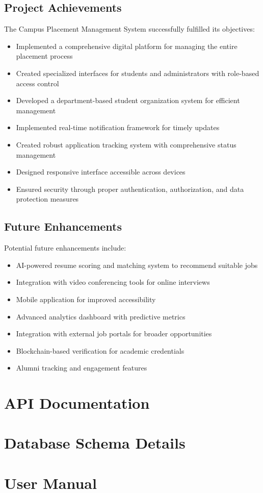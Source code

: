 \documentclass[12pt,a4paper]{report}
\begin{document}
\section{Project Achievements}
The Campus Placement Management System successfully fulfilled its objectives:
\begin{itemize}
    \item Implemented a comprehensive digital platform for managing the entire placement process
    \item Created specialized interfaces for students and administrators with role-based access control
    \item Developed a department-based student organization system for efficient management
    \item Implemented real-time notification framework for timely updates
    \item Created robust application tracking system with comprehensive status management
    \item Designed responsive interface accessible across devices
    \item Ensured security through proper authentication, authorization, and data protection measures
\end{itemize}

\section{Future Enhancements}
Potential future enhancements include:
\begin{itemize}
    \item AI-powered resume scoring and matching system to recommend suitable jobs
    \item Integration with video conferencing tools for online interviews
    \item Mobile application for improved accessibility
    \item Advanced analytics dashboard with predictive metrics
    \item Integration with external job portals for broader opportunities
    \item Blockchain-based verification for academic credentials
    \item Alumni tracking and engagement features
\end{itemize}

\appendix
\chapter{API Documentation}
\chapter{Database Schema Details}
\chapter{User Manual}
\end{document}
